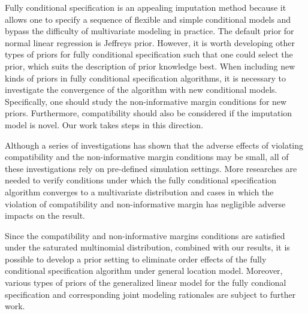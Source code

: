 \documentclass[12pt, fullpage, a4paper]{article}
\begin{document}
Fully conditional specification is an appealing imputation method because it allows one to specify a sequence of flexible and simple conditional models and bypass the difficulty of multivariate modeling in practice. The default prior for normal linear regression is Jeffreys prior. However, it is worth developing other types of priors for fully conditional specification such that one could select the prior, which suits the description of prior knowledge best. When including new kinds of priors in fully conditional specification algorithms, it is necessary to investigate the convergence of the algorithm with new conditional models. Specifically, one should study the non-informative margin conditions for new priors. Furthermore, compatibility should also be considered if the imputation model is novel. Our work takes steps in this direction. 

Although a series of investigations has shown that the adverse effects of violating compatibility and the non-informative margin conditions may be small, all of these investigations rely on pre-defined simulation settings. More researches are needed to verify conditions under which the fully conditional specification algorithm converges to a multivariate distribution and cases in which the violation of compatibility and non-informative margin has negligible adverse impacts on the result.

Since the compatibility and non-informative margins conditions are satisfied under the saturated multinomial distribution, combined with our results, it is possible to develop a prior setting to eliminate order effects of the fully conditional specification algorithm under general location model. Moreover, various types of priors of the generalized linear model for the fully condional specification and corresponding joint modeling rationales are subject to further work.   


\newpage


\end{document}
